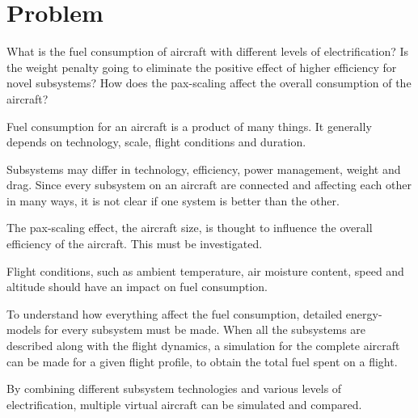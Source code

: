 \documentclass[english]{kththesis}
\begin{document}
\section{Problem}

What is the fuel consumption of aircraft with different levels of electrification?
Is the weight penalty going to eliminate the positive effect of higher efficiency for novel subsystems?
How does the pax-scaling affect the overall consumption of the aircraft?

Fuel consumption for an aircraft is a product of many things. It generally depends on technology, scale, flight conditions and duration.

Subsystems may differ in technology, efficiency, power management, weight and drag. Since every subsystem on an aircraft are connected and affecting each other in many ways, it is not clear if one system is better than the other.

The pax-scaling effect, the aircraft size, is thought to influence the overall efficiency of the aircraft. This must be investigated.

Flight conditions, such as ambient temperature, air moisture content, speed and altitude should have an impact on fuel consumption.

To understand how everything affect the fuel consumption, detailed energy-models for every subsystem must be made. When all the subsystems are described along with the flight dynamics, a simulation for the complete aircraft can be made for a given flight profile, to obtain the total fuel spent on a flight.

By combining different subsystem technologies and various levels of electrification, multiple virtual aircraft can be simulated and compared.


\end{document}
